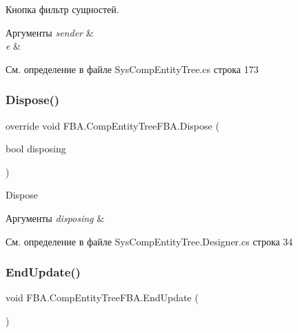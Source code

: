Кнопка фильтр сущностей. 


\begin{DoxyParams}{Аргументы}
{\em sender} & \\
\hline
{\em e} & \\
\hline
\end{DoxyParams}


См. определение в файле Sys\+Comp\+Entity\+Tree.\+cs строка 173

\mbox{\label{class_f_b_a_1_1_comp_entity_tree_f_b_a_a682acd15f071cb748546c0a86c185c48}} 
\subsubsection{\texorpdfstring{Dispose()}{Dispose()}}
{\footnotesize\ttfamily override void F\+B\+A.\+Comp\+Entity\+Tree\+F\+B\+A.\+Dispose (\begin{DoxyParamCaption}\item[{bool}]{disposing }\end{DoxyParamCaption})\hspace{0.3cm}{\ttfamily [protected]}}



Dispose 


\begin{DoxyParams}{Аргументы}
{\em disposing} & \\
\hline
\end{DoxyParams}


См. определение в файле Sys\+Comp\+Entity\+Tree.\+Designer.\+cs строка 34

\mbox{\label{class_f_b_a_1_1_comp_entity_tree_f_b_a_a145279e9493a92335ed930fd8469c08b}} 
\subsubsection{\texorpdfstring{End\+Update()}{EndUpdate()}}
{\footnotesize\ttfamily void F\+B\+A.\+Comp\+Entity\+Tree\+F\+B\+A.\+End\+Update (\begin{DoxyParamCaption}{ }\end{DoxyParamCaption})}



